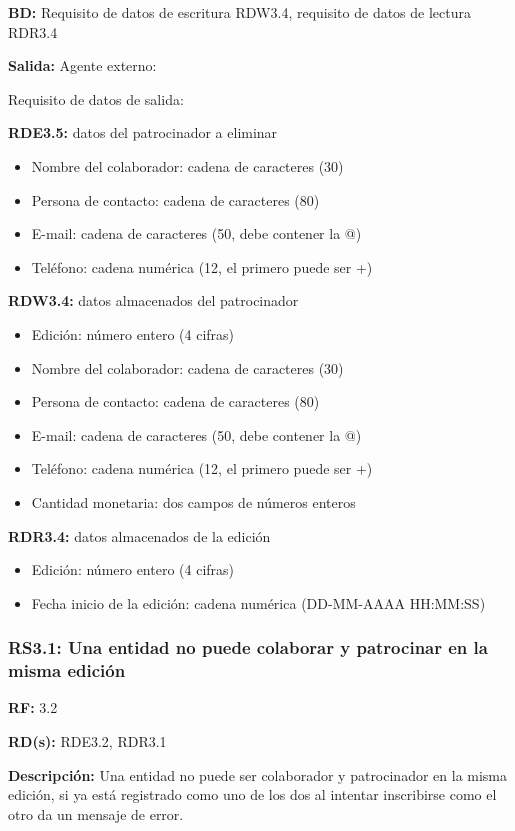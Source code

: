 \textbf{BD:} Requisito de datos de escritura RDW3.4, requisito de datos de lectura RDR3.4

\textbf{Salida:} Agente externo:

Requisito de datos de salida:

\textbf{RDE3.5:} datos del patrocinador a eliminar
\begin{itemize}
	\item Nombre del colaborador: cadena de caracteres (30)
	\item Persona de contacto: cadena de caracteres (80)
	\item E-mail: cadena de caracteres (50, debe contener la @)
	\item Teléfono: cadena numérica (12, el primero puede ser +)
\end{itemize}

\textbf{RDW3.4:} datos almacenados del patrocinador
\begin{itemize}
	\item Edición: número entero (4 cifras)
\newline
	\item Nombre del colaborador: cadena de caracteres (30)
	\item Persona de contacto: cadena de caracteres (80)
	\item E-mail: cadena de caracteres (50, debe contener la @)
	\item Teléfono: cadena numérica (12, el primero puede ser +)
\newline
	\item Cantidad monetaria: dos campos de números enteros
\end{itemize}

\textbf{RDR3.4:} datos almacenados de la edición
\begin{itemize}
	\item Edición: número entero (4 cifras)
	\item Fecha inicio de la edición: cadena numérica (DD-MM-AAAA HH:MM:SS)
\end{itemize}

\subsubsection{RS3.1: Una entidad no puede colaborar y patrocinar en la misma edición}
\textbf{RF:} 3.2

\textbf{RD(s):} RDE3.2, RDR3.1

\textbf{Descripción:} Una entidad no puede ser colaborador y patrocinador en la misma edición, si ya está registrado como uno de los dos al intentar inscribirse como el otro da un mensaje de error.

